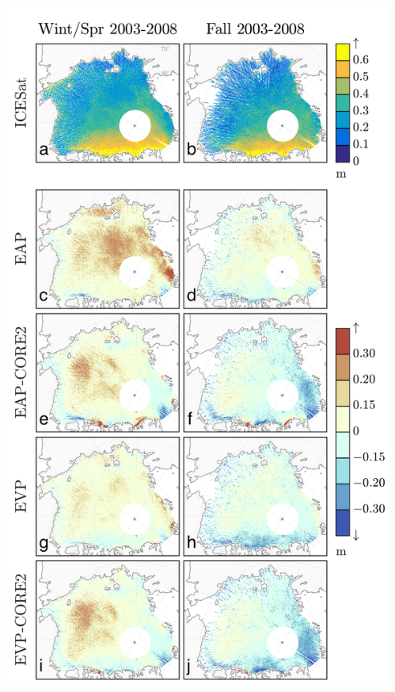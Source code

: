 \documentclass[aspectratio=169,11pt]{beamer}
\begin{document}
\begin{frame}
\begin{columns} %
\begin{column}{0.3\textwidth}
\includegraphics[height=\textheight,keepaspectratio]{Figures/R1009RBRceap01a_R1009Gceap01d_R1009RBRcevp01a_R1009Gcevp01d_icesat_zwally_2003_2008.png}
\end{column}
\begin{column}{0.7\textwidth}

\end{column}
\end{columns}
\end{frame}
\end{document}
